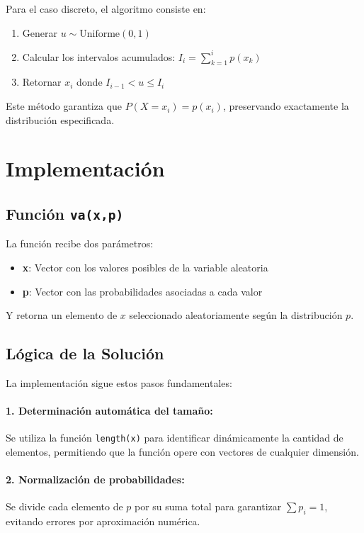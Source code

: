 \documentclass{article}
\begin{document}
    Para el caso discreto, el algoritmo consiste en:
    \begin{enumerate}
        \item Generar $u \sim \text{Uniforme}(0,1)$
        \item Calcular los intervalos acumulados: $I_i = \sum_{k=1}^{i} p(x_k)$
        \item Retornar $x_i$ donde $I_{i-1} < u \leq I_i$
    \end{enumerate}
    
    Este método garantiza que $P(X = x_i) = p(x_i)$, preservando exactamente la distribución especificada.
    
    \section*{Implementación}
    
    \subsection*{Función \texttt{va(x,p)}}
    
    La función recibe dos parámetros:
    \begin{itemize}
        \item \textbf{x}: Vector con los valores posibles de la variable aleatoria
        \item \textbf{p}: Vector con las probabilidades asociadas a cada valor
    \end{itemize}
    
    Y retorna un elemento de $x$ seleccionado aleatoriamente según la distribución $p$.
    
    \subsection*{Lógica de la Solución}
    
    La implementación sigue estos pasos fundamentales:
    
    \paragraph{1. Determinación automática del tamaño:}
    Se utiliza la función \texttt{length(x)} para identificar dinámicamente la cantidad de elementos, permitiendo que la función opere con vectores de cualquier dimensión.
    
    \paragraph{2. Normalización de probabilidades:}
    Se divide cada elemento de $p$ por su suma total para garantizar $\sum p_i = 1$, evitando errores por aproximación numérica.
    
\end{document}

